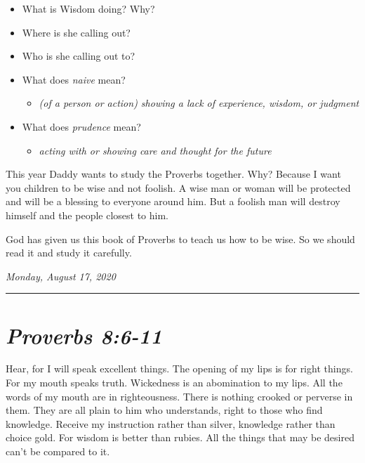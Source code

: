 \documentclass[
]{book}
\providecommand{\tightlist}{%
  \setlength{\itemsep}{0pt}\setlength{\parskip}{0pt}}
\begin{document}
\begin{itemize}
\tightlist
\item
  What is Wisdom doing? Why?
\item
  Where is she calling out?
\item
  Who is she calling out to?
\item
  What does \emph{naive} mean?

  \begin{itemize}
  \tightlist
  \item
    \emph{(of a person or action) showing a lack of experience, wisdom, or judgment}
  \end{itemize}
\item
  What does \emph{prudence} mean?

  \begin{itemize}
  \tightlist
  \item
    \emph{acting with or showing care and thought for the future}
  \end{itemize}
\end{itemize}

This year Daddy wants to study the Proverbs together. Why? Because I want you children to be wise and not foolish. A wise man or woman will be protected and will be a blessing to everyone around him. But a foolish man will destroy himself and the people closest to him.

God has given us this book of Proverbs to teach us how to be wise. So we should read it and study it carefully.

\emph{Monday, August 17, 2020}

\begin{center}\rule{0.5\linewidth}{0.5pt}\end{center}

\hypertarget{proverbs-86-11}{%
\section{\texorpdfstring{\emph{Proverbs 8:6-11}}{Proverbs 8:6-11}}\label{proverbs-86-11}}

Hear, for I will speak excellent things.
The opening of my lips is for right things.
For my mouth speaks truth.
Wickedness is an abomination to my lips.
All the words of my mouth are in righteousness.
There is nothing crooked or perverse in them.
They are all plain to him who understands,
right to those who find knowledge.
Receive my instruction rather than silver,
knowledge rather than choice gold.
For wisdom is better than rubies.
All the things that may be desired can't be compared to it.
\end{document}
